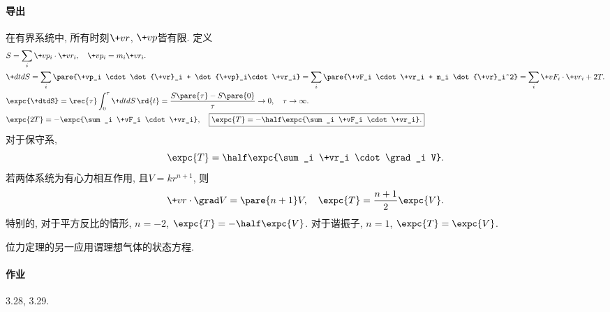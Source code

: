 \documentclass[../LectureNotes.tex]{subfiles}
\begin{document}
\paragraph{导出} %
\label{par:导出}

在有界系统中, 所有时刻$\+vr$, $\+vp$皆有限. 定义
\begin{align*}
    & S = \sum_i \+vp_i \cdot \+vr_i,\quad \+vp_i = m_i \+vr_i. \\
    & \+dtdS = \sum_i \pare{\+vp_i \cdot \dot{\+vr}_i + \dot{\+vp}_i\cdot \+vr_i} = \sum_i \pare{\+vF_i \cdot \+vr_i + m_i \dot{\+vr}_i^2} = \sum_i \+vF_i \cdot \+vr_i + 2T. \\
    & \expc{\+dtdS} = \rec{\tau} \int_0^\tau \+dtdS \,\rd{t} = \frac{S\pare{\tau} - S\pare{0}}{\tau} \rightarrow 0,\quad \tau \rightarrow \infty. \\
    & \expc{2T} = -\expc{\sum_i \+vF_i \cdot \+vr_i}, \quad \boxed{\expc{T} = -\half \expc{\sum_i \+vF_i \cdot \+vr_i}.}
\end{align*}
对于保守系,
\[ \expc{T} = \half \expc{\sum_i \+vr_i \cdot \grad_i V}. \]
若两体系统为有心力相互作用, 且$V = kr^{n+1}$, 则
\[ \+vr\cdot\grad V = \pare{n+1}V,\quad \expc{T} = \frac{n+1}{2}\expc{V}. \]
特别的, 对于平方反比的情形, $n=-2$, $\displaystyle \expc{T} = -\half \expc{V}$. 对于谐振子, $n=1$, $\expc{T} = \expc{V}$.
\begin{remark}
    位力定理的另一应用谓理想气体的状态方程.
\end{remark}


\paragraph{作业} %
\label{par:作业}

3.28, 3.29.




\end{document}

